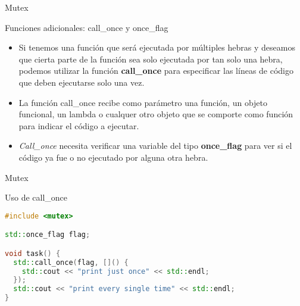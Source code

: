 \begin{frame}{Mutex}
\begin{block}{Funciones adicionales: call\_once y once\_flag}
\begin{itemize}
  \item Si tenemos una función que será ejecutada por múltiples hebras y deseamos que cierta parte de la función sea solo ejecutada por tan solo una hebra, podemos utilizar la función \textbf{call\_once} para especificar las líneas de código que deben ejecutarse solo una vez.
  \item La función call\_once recibe como parámetro una función, un objeto funcional, un lambda o cualquer otro objeto que se comporte como función para indicar el código a ejecutar.
  \item \textit{Call\_once} necesita verificar una variable del tipo \textbf{once\_flag} para ver si el código ya fue o no ejecutado por alguna otra hebra.
\end{itemize}
\end{block}
\end{frame}

\begin{frame}[fragile]{Mutex}
\begin{block}{Uso de call\_once}
\begin{lstlisting}[language=C++, basicstyle=\small]
#include <mutex>

std::once_flag flag;

void task() {
  std::call_once(flag, []() {
    std::cout << "print just once" << std::endl;
  });
  std::cout << "print every single time" << std::endl;
}

\end{lstlisting}
\end{block}
\end{frame}